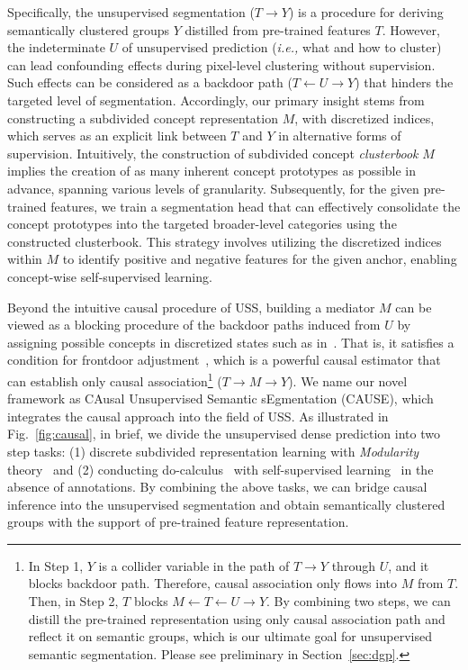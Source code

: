 \documentclass{article} \usepackage{iclr2024_conference,times}
\begin{document}
Specifically, the unsupervised segmentation ($T \rightarrow Y$) is a procedure for deriving semantically clustered groups $Y$ distilled from pre-trained features $T$. However, the indeterminate $U$ of unsupervised prediction (\textit{i.e.,} what and how to cluster) can lead confounding effects during pixel-level clustering without supervision. Such effects can be considered as a backdoor path ($T \leftarrow U \rightarrow Y$) that hinders the targeted level of segmentation. Accordingly, our primary insight stems from constructing a subdivided concept representation $M$, with discretized indices, which serves as an explicit link between $T$ and $Y$ in alternative forms of supervision. Intuitively, the construction of subdivided concept \textit{clusterbook} $M$ implies the creation of as many inherent concept prototypes as possible in advance, spanning various levels of granularity. Subsequently, for the given pre-trained features, we train a segmentation head that can effectively consolidate the concept prototypes into the targeted broader-level categories using the constructed clusterbook. This strategy involves utilizing the discretized indices within $M$ to identify positive and negative features for the given anchor, enabling concept-wise self-supervised learning.

Beyond the intuitive causal procedure of USS, building a mediator $M$ can be viewed as a blocking procedure of the backdoor paths induced from $U$ by assigning possible concepts in discretized states such as in~\citet{van2017neural, esser2021taming}. That is, it satisfies a condition for frontdoor adjustment~\citep{pearl1993bayesian}, which is a powerful causal estimator that can establish only causal association\footnote{In Step 1, $Y$ is a collider variable in the path of $T {\rightarrow} Y$ through $U$, and it blocks backdoor path. Therefore, causal association only flows into $M$ from $T$. Then, in Step 2, $T$ blocks $M {\leftarrow} T {\leftarrow} U {\rightarrow} Y$. By combining two steps, we can distill the pre-trained representation using only causal association path and reflect it on semantic groups, which is our ultimate goal for unsupervised semantic segmentation. Please see preliminary in Section~\ref{sec:dgp}.} ($T \rightarrow M \rightarrow Y$). We name our novel framework as CAusal Unsupervised Semantic sEgmentation (CAUSE), which integrates the causal approach into the field of USS. As illustrated in Fig.~\ref{fig:causal}, in brief, we divide the unsupervised dense prediction into two step tasks: (1) discrete subdivided representation learning with \textit{Modularity} theory~\citep{newman2006modularity} and (2) conducting do-calculus~\citep{pearl1995causal} with self-supervised learning~\citep{oord2018representation} in the absence of annotations. By combining the above tasks, we can bridge causal inference into the unsupervised segmentation and obtain semantically clustered groups with the support of pre-trained feature representation.
\end{document}
